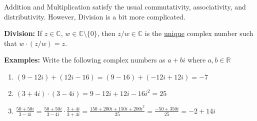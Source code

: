 \documentclass{article}
\begin{document}
\vskip 0.5cm
Addition and Multiplication satisfy the usual commutativity, associativity, and distributivity. However, Division is a bit more complicated. 

\vskip 0.5cm
\textbf{\textbf{Division:}} If $z \in \mathbb{C}$, $w \in \mathbb{C} \setminus \{0\}$, then $z/w \in \mathbb{C}$ is the \underline{unique} complex number such that $w \cdot (z/w) = z$.

\vskip 0.5cm
\textbf{Examples:} Write the following complex numbers as $a + bi$ where $a, b \in \mathbb{R}$

\begin{enumerate}
  \item $(9-12i) + (12i - 16) = (9 - 16) + (-12i + 12i) = -7$ 
  \item $(3 + 4i) \cdot (3 - 4i) = 9 -12i + 12i - 16i^2 = 25$
  \item $\frac{50 + 50i}{3 - 4i} = \frac{50 + 50i}{3 - 4i} \cdot \frac{3 + 4i}{3 + 4i} = \frac{150 + 200i + 150i + 200i^2}{25}  = \frac{-50 + 350i}{25} = -2 + 14i$ 
\end{enumerate}

\pagebreak


\end{document}
